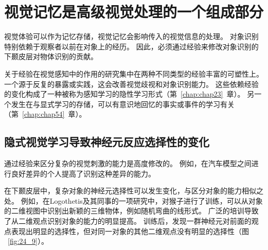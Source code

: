 \section{视觉记忆是高级视觉处理的一个组成部分}

视觉体验可以作为记忆存储，视觉记忆会影响传入的视觉信息的处理。
对象识别特别依赖于观察者以前在对象上的经历。
因此，必须通过经验来修改对象识别的下颞皮层对物体识别的贡献。


关于经验在视觉感知中的作用的研究集中在两种不同类型的经验丰富的可塑性上。
一个源于反复的暴露或实践，这会改善视觉歧视和对象识别能力。
这些依赖经验的变化构成了一种被称为感知学习的隐性学习形式（第~\ref{chap:chap23}~章）。
另一个发生在与显式学习的存储，可以有意识地回忆的事实或事件的学习有关（第~\ref{chap:chap54}~章）。



\subsection{隐式视觉学习导致神经元反应选择性的变化}

通过经验来区分复杂的视觉刺激的能力是高度修改的。
例如，在汽车模型之间进行良好差异的个人提高了识别这种差异的能力。


在下颞皮层中，复杂对象的神经元选择性可以发生变化，与区分对象的能力相似之处。
例如，在Logothetis及其同事的一项研究中，对猴子进行了训练，可以从对象的二维视图中识别出新颖的三维物体，例如随机弯曲的线形式。
广泛的培训导致了从二维观点识别对象的能力的明显提高。
训练后，发现一群神经元对前面的观点表现出明显的选择性，但对同一对象的其他二维观点没有明显的选择性（图 ~\ref{fig:24_9}）。


